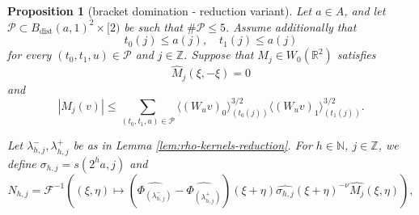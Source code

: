 \documentclass[12pt,reqno]{amsart}
\theoremstyle{plain}
\newtheorem{proposition}[theorem]{Proposition}
\numberwithin{equation}{section}
\theoremstyle{remark}
\newcommand{\uses}[1]{}
\newcommand{\usesdefs}[1]{}
\newcommand{\Z}{{\mathbb Z}}
\newcommand{\N}{{\mathbb N}}
\DeclareMathOperator{\dist}{dist}
\begin{document}
\begin{proposition}[bracket domination - reduction variant]
\label{lem:increase-data-bracket-domination}\uses{lem:rho-kernels-reduction,two bump estimate,bump triangle,orthogonal decay,convolution vector,lem:affine-diagonal-cancellation-reduction,Properties of distance of sequences,Operations on spaced sequences}\usesdefs{gaussian,bracket bump,auto:Wiener-space-definition,auto:convolution-along-vector-definition,multiplicatively spaced monotone sequences,Distance of spaced sequences,closed balls in A,standard bump,geometric parameters,auto:unitary-matrices-definition,square root Gaussian difference}
Let \(a\in A\), and let
$
\mathcal P\subset B_{\dist}(a,1)^2\times[2)$ be such that $\#\mathcal P\leq5$. Assume additionally that
\begin{equation}
    \label{E:increase-data-one-sided-scales}
    t_0(j)\leq a(j),
    \quad
    t_1(j)\leq a(j)
\end{equation}
for every \((t_0,t_1,u)\in\mathcal P\) and \(j\in\mathbb Z\).
Suppose that \(M_j\in W_0(\mathbb R^2)\) satisfies
\begin{equation}\label{auto:reduction-diagonal-cancellation}
\widehat M_j(\xi,-\xi)=0
\end{equation}
and
\begin{equation}\label{auto:reduction-kernel-decay}
|M_j(v)|
\leq
\sum_{(t_0,t_1,u)\in\mathcal P}
\langle(W_uv)_0\rangle_{(t_0(j))}^{3/2}
\langle(W_uv)_1\rangle_{(t_1(j))}^{3/2}.
\end{equation}

Let $\lambda_{h,j}^-,\lambda_{h,j}^+$ be as in Lemma \ref{lem:rho-kernels-reduction}.
For $h\in\N$, $j\in \Z$, we define
$
\sigma_{h,j} = s(2^{h} a,j)
$
and
\begin{equation}\label{auto:increase-data-N-kernel}
N_{h,j} =
\mathcal F^{-1}\left((\xi,\eta) \mapsto (\widehat{\Phi_{(\lambda_{h,j}^-)}}-\widehat{\Phi_{(\lambda_{h,j}^+)}})(\xi+\eta) \widehat{\sigma_{h,j}}(\xi+\eta)^{-\nu} \widehat{M_j}(\xi,\eta)\right),
\end{equation}



\end{proposition}
\end{document}

